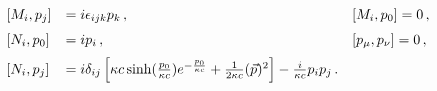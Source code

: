 \begin{equation}
\begin{array}{lll}
[ M_i , p_j ] & = i\epsilon_{ijk}p_k\, ,\qquad & [ M_i , p_0 ]  =
0\, ,\medskip\cr [ N_i , p_0 ] & = i p_i\, , \qquad & [ p_\mu ,
p_\nu ] = 0\, ,\medskip\cr[ N_i , p_j ]& =
i\delta_{ij}\left[\kappa c\sinh(\frac {p_0}{\kappa c})
e^{-\frac{p_0}{\kappa c}}  + \frac1{2\kappa c} (\vec p)^2\right] -
\frac {i}{\kappa c} p_i p_j\,
.&\end{array}\label{r22}\end{equation}\
